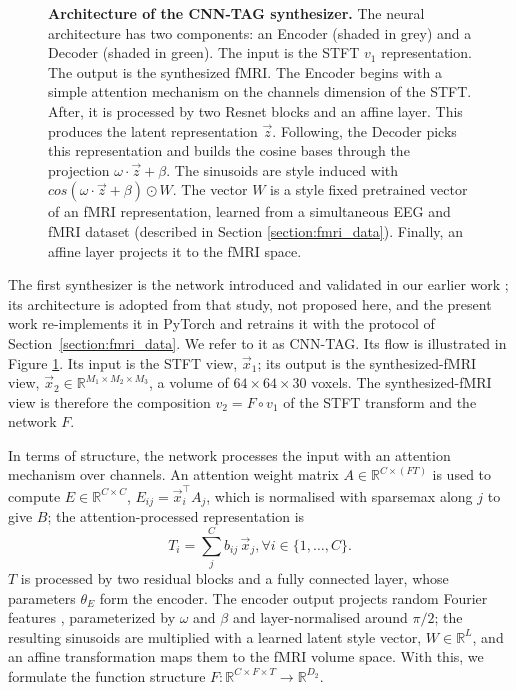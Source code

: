 \documentclass[pdflatex,referee,sn-basic]{sn-jnl}%
\begin{document}
\begin{figure}[!t]
\begin{tikzpicture}
    \end{tikzpicture}
    \caption{\textbf{Architecture of the CNN-TAG synthesizer.} The neural architecture has two components: an Encoder (shaded in grey) and a Decoder (shaded in green). The input is the STFT $v_1$ representation. The output is the synthesized fMRI. The Encoder begins with a simple attention mechanism on the channels dimension of the STFT. After, it is processed by two Resnet blocks and an affine layer. This produces the latent representation $\vec{z}$. Following, the Decoder picks this representation and builds the cosine bases through the projection $\omega \cdot \vec{z} + \beta$. The sinusoids are style induced with $cos(\omega \cdot \vec{z} + \beta)\odot W$. The vector $W$ is a style fixed pretrained vector of an fMRI representation, learned from a simultaneous EEG and fMRI dataset (described in Section \ref{section:fmri_data}). Finally, an affine layer projects it to the fMRI space.}
    \label{fig:horizontal_architecture}
\end{figure}

The first synthesizer is the network introduced and validated in our earlier work \cite{calhas2022eeg}; its architecture is adopted from that study, not proposed here, and the present work re-implements it in PyTorch and retrains it with the protocol of Section~\ref{section:fmri_data}. We refer to it as CNN-TAG. Its flow is illustrated in Figure \ref{fig:horizontal_architecture}. Its input is the STFT view, $\vec{x}_1$; its output is the synthesized-fMRI view, $\vec{x}_2 \in \mathbb{R}^{M_1 \times M_2 \times M_3}$, a volume of $64\times64\times30$ voxels. The synthesized-fMRI view is therefore the composition $v_2 = F \circ v_1$ of the STFT transform and the network $F$.

In terms of structure, the network processes the input with an attention mechanism over channels. An attention weight matrix $A \in \mathbb{R}^{C \times (F T)}$ is used to compute $E \in \mathbb{R}^{C \times C}$, $E_{ij} = \vec{x}_i^\top A_j$, which is normalised with sparsemax along $j$ to give $B$; the attention-processed representation is
\begin{equation}\label{equation:attention_output}
    T_i  = \sum_j^C b_{ij}\, \vec{x}_j, \forall i \in \{1, \dots, C\}.
\end{equation}
$T$ is processed by two residual blocks \cite{he2016deep} and a fully connected layer, whose parameters $\theta_E$ form the encoder. The encoder output projects random Fourier features \cite{rahimi2007random,tancik2020fourier}, parameterized by $\omega$ and $\beta$ and layer-normalised around $\pi/2$; the resulting sinusoids are multiplied with a learned latent style vector, $W \in \mathbb{R}^L$, and an affine transformation maps them to the fMRI volume space. With this, we formulate the function structure $F: \mathbb{R}^{C \times F \times T} \to \mathbb{R}^{D_2}$.
\end{document}
